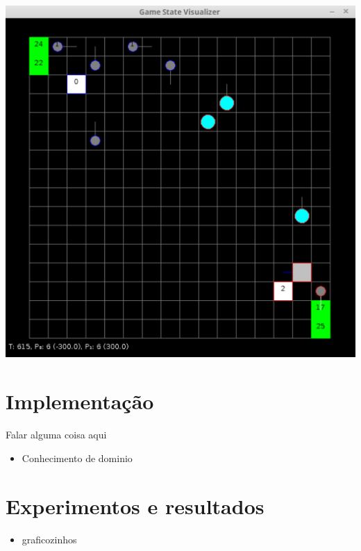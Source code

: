 \documentclass[a0,portrait]{a0poster}
\begin{document}
\begin{multicols}{2}
\begin{center}
	\includegraphics[width=0.6\linewidth]{microRts.pdf}
\end{center}	


\color{NavyBlue}
\section*{\huge Implementa\c{c}\~ao}
\color{Black}

Falar alguma coisa aqui

\vspace{10mm}

\begin{itemize}
	\item Conhecimento de dominio
\end{itemize}


\color{NavyBlue}
\section*{\huge Experimentos e resultados}
\color{Black}

\begin{itemize}
	\item graficozinhos
\end{itemize}


\vspace{13mm}




\end{multicols}
\end{document}
